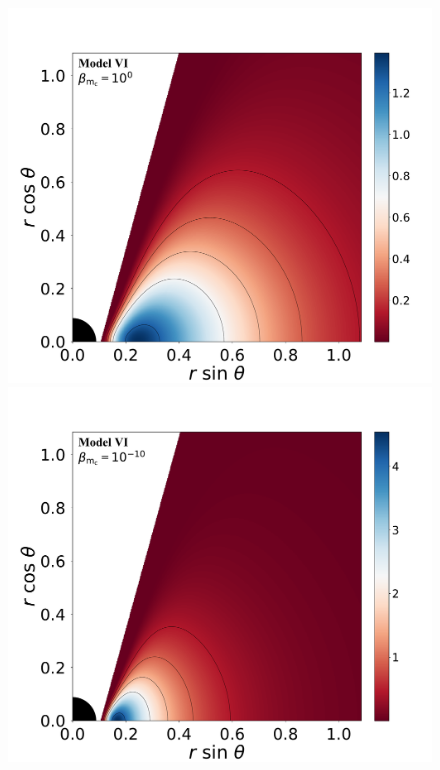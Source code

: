 \documentclass[twocolumn,aps,showpacs,showkeys,prd,superscriptaddress,byrevtex, amsmath]{revtex4-1}
\begin{document}
\begin{figure}
\includegraphics[scale=0.14]{figures/fig2_VI_1.pdf}
\hspace{-0.2cm}
\includegraphics[scale=0.14]{figures/fig2_VI__10.pdf}
\\

\end{figure}
\end{document}
